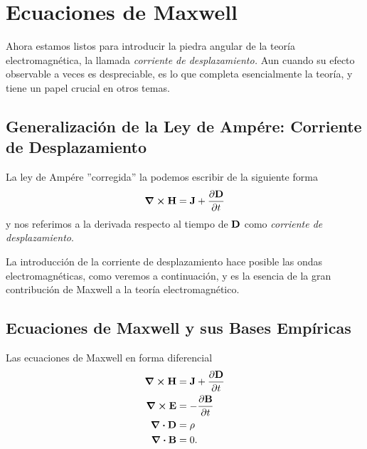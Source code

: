 \chapter{Ecuaciones de Maxwell}
Ahora estamos listos para introducir la piedra angular de la teoría electromagnética, la llamada \textit{corriente de desplazamiento.} Aun cuando su efecto observable a veces es despreciable, es lo que completa esencialmente la teoría, y tiene un papel crucial en otros temas.

\section{Generalización de la Ley de Ampére: Corriente de Desplazamiento}
\begin{tcolorbox}
    La ley de Ampére ''corregida'' la podemos escribir de la siguiente forma
    \begin{equation}
        \curl{\vb{H}} = \vb{J} + \pdv{\vb{D}}{t}
    \end{equation}
    y nos referimos a la derivada respecto al tiempo de $\vb{D}$ como \textit{corriente de desplazamiento}.
\end{tcolorbox}
La introducción de la corriente de desplazamiento hace posible las ondas electromagnéticas, como veremos a continuación, y es la esencia de la gran contribución de Maxwell a la teoría electromagnético.

\section{Ecuaciones de Maxwell y sus Bases Empíricas}
Las ecuaciones de Maxwell en forma diferencial
\begin{align}
    \curl{\vb{H}} &= \vb{J} + \pdv{\vb{D}}{t} \label{ampere} \\
    \curl{\vb{E}} &= - \pdv{\vb{B}}{t} \label{faraday} \\
    \div{\vb{D}} &= \rho \label{gaussE} \\
    \div{\vb{B}} &= 0. \label{gaussM}
\end{align}



